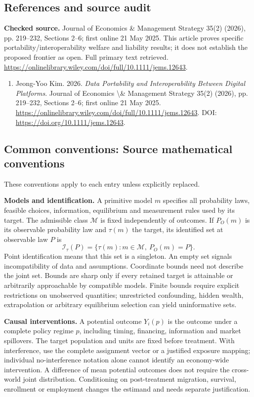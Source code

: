 \documentclass[11pt,a4paper]{article}
\begin{document}
\subsection*{References and source audit}
\textbf{Checked source.} Journal of Economics \& Management Strategy 35(2) (2026), pp. 219--232, Sections 2--6; first online 21 May 2025. This article proves specific portability/interoperability welfare and liability results; it does not establish the proposed frontier as open. Full primary text retrieved. \url{https://onlinelibrary.wiley.com/doi/full/10.1111/jems.12643}.
\begin{enumerate}\raggedright
\item\hypertarget{definitions:source:30007691:1}{} Jeong-Yoo Kim. 2026. \emph{Data Portability and Interoperability Between Digital Platforms}. Journal of Economics \textbackslash{}\& Management Strategy 35(2) (2026), pp. 219--232, Sections 2--6; first online 21 May 2025.
\url{https://onlinelibrary.wiley.com/doi/full/10.1111/jems.12643}.
DOI: \url{https://doi.org/10.1111/jems.12643}.
\end{enumerate}

\subsection*{Common conventions: Source mathematical conventions}

These conventions apply to each entry unless explicitly replaced.

\textbf{Models and identification.} A primitive model \(m\) specifies all probability laws, feasible choices, information, equilibrium and measurement rules used by its target. The admissible class \(\mathcal M\) is fixed independently of outcomes. If \(P_O(m)\) is its observable probability law and \(\tau(m)\) the target, its identified set at observable law \(P\) is
\[
 \mathcal I_\tau(P)=\{\tau(m):m\in\mathcal M,\ P_O(m)=P\}.
\]
Point identification means that this set is a singleton. An empty set signals incompatibility of data and assumptions. Coordinate bounds need not describe the joint set. Bounds are sharp only if every retained target is attainable or arbitrarily approachable by compatible models. Finite bounds require explicit restrictions on unobserved quantities; unrestricted confounding, hidden wealth, extrapolation or arbitrary equilibrium selection can yield uninformative sets.

\textbf{Causal interventions.} A potential outcome \(Y_i(p)\) is the outcome under a complete policy regime \(p\), including timing, financing, information and market spillovers. The target population and units are fixed before treatment. With interference, use the complete assignment vector or a justified exposure mapping; individual no-interference notation alone cannot identify an economy-wide intervention. A difference of mean potential outcomes does not require the cross-world joint distribution. Conditioning on post-treatment migration, survival, enrollment or employment changes the estimand and needs separate justification.
\end{document}
